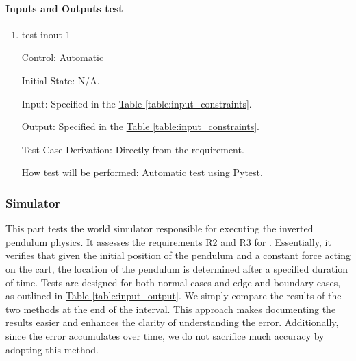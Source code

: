 \documentclass[12pt, titlepage]{article}
\begin{document}
\paragraph{Inputs and Outputs test}

\begin{enumerate}

\item{test-inout-1\\}

Control: Automatic
					
Initial State: N/A.
					
Input: Specified in the \hyperref[table:input_constraints]{Table \ref*{table:input_constraints}}.
					
Output: Specified in the \hyperref[table:input_constraints]{Table \ref*{table:input_constraints}}.

Test Case Derivation: Directly from the requirement.
					
How test will be performed: 
Automatic test using Pytest.

\end{enumerate}

\subsubsection{Simulator} \label{func_test_simulator}

This part tests the world simulator responsible for executing 
the inverted pendulum physics. It assesses the requirements 
R2 and R3 for \progname{}. Essentially, it verifies that given the initial 
position of the pendulum and a constant force acting on the cart, 
the location of the pendulum is determined after a specified duration of time.
Tests are designed for both normal cases and edge and boundary cases, as outlined 
in \hyperref[table:input_output]{Table \ref*{table:input_output}}.
We simply compare the results of the two methods at the end of the interval. 
This approach makes documenting the results easier and enhances the clarity 
of understanding the error. Additionally, since the error accumulates over time, 
we do not sacrifice much accuracy by adopting this method.
\end{document}

